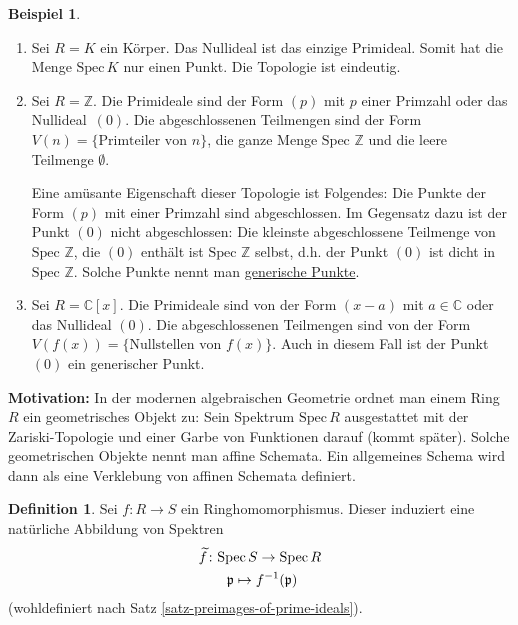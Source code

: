 \documentclass[reqno,12pt]{article}
\numberwithin{equation}{section}
\newcommand{\bC}{\mathbb{C}}
\newcommand{\bZ}{\mathbb{Z}}
\newcommand{\wt}{\widetilde}
\newcommand{\Spec}{\text{Spec}\,}
\theoremstyle{plain}
\theoremstyle{definition}
\newtheorem{definition}[thm]{Definition}
\newtheorem{example}[thm]{Beispiel}
\begin{document}
\begin{example}
\label{example-spectra-of-rings}
\
  \begin{enumerate}
    \item Sei $R=K$ ein Körper. Das Nullideal ist das einzige Primideal. Somit hat die Menge $\Spec K$ nur einen Punkt. Die Topologie ist eindeutig.

    \item Sei $R=\bZ$. Die Primideale sind der Form $(p)$ mit $p$ einer Primzahl oder das Nullideal~$(0)$. Die abgeschlossenen Teilmengen sind der Form $V(n) = \{\text{Primteiler von $n$} \}$, die ganze Menge $\Spec \, \bZ$ und die leere Teilmenge $\emptyset$.

    Eine amüsante Eigenschaft dieser Topologie ist Folgendes: Die Punkte der Form $(p)$ mit einer Primzahl sind abgeschlossen. Im Gegensatz dazu ist der Punkt $(0)$ nicht abgeschlossen: Die kleinste abgeschlossene Teilmenge von $\Spec \, \bZ$, die $(0)$ enthält ist $\Spec \, \bZ$ selbst, d.h. der Punkt $(0)$ ist dicht in $\Spec \, \bZ$. Solche Punkte nennt man \href{https://en.wikipedia.org/wiki/Generic_point}{\sf generische Punkte}.

    \item Sei $R=\bC[x]$. Die Primideale sind von der Form $(x-a)$ mit $a \in \bC$ oder das Nullideal $(0)$. Die abgeschlossenen Teilmengen sind von der Form $V(f(x)) = \{\text{Nullstellen von $f(x)$} \}$. Auch in diesem Fall ist der Punkt $(0)$ ein generischer Punkt.
  \end{enumerate}
\end{example}

\medskip
\noindent \textbf{Motivation:} In der modernen algebraischen Geometrie ordnet man einem Ring $R$ ein geometrisches Objekt zu: Sein Spektrum $\Spec R$ ausgestattet mit der Zariski-Topologie und einer Garbe von Funktionen darauf (kommt später). Solche geometrischen Objekte nennt man affine Schemata. Ein allgemeines Schema wird dann als eine Verklebung von affinen Schemata definiert.



\begin{definition}\label{definition-induced-map-on-spectra}
Sei $f \colon R \to S$ ein Ringhomomorphismus. Dieser induziert eine natürliche Abbildung von Spektren
\begin{align}\label{eq.-induced-map-on-spectra}
  & \wt{f} \colon \Spec S \to \Spec R \\ \notag
  &  \qquad \mathfrak{p} \mapsto f^{-1}(\mathfrak{p})
\end{align}
(wohldefiniert nach Satz \ref{satz-preimages-of-prime-ideals}).
\end{definition}
\end{document}
